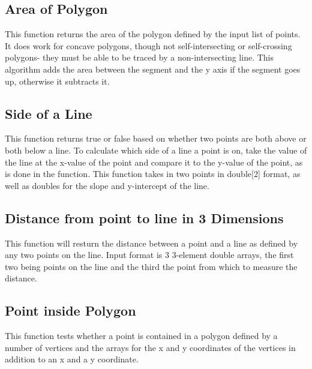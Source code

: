 \subsection{Area of Polygon}
This function returns the area of the polygon defined by the input list of points. It does work for concave polygons, though not self-intersecting or self-crossing polygons- they must be able to be traced by a non-intersecting line. This algorithm adds the area between the segment and the y axis if the segment goes up, otherwise it subtracts it.


\subsection{Side of a Line}
This function returns true or false based on whether two points are both above or both below a line. To calculate which side of a line a point is on, take the value of the line at the x-value of the point and compare it to the y-value of the point, as is done in the function. This function takes in two points in double[2] format, as well as doubles for the slope and y-intercept of the line.


\subsection{Distance from point to line in 3 Dimensions}
This function will resturn the distance between a point and a line as defined by any two points on the line. Input format is 3 3-element double arrays, the first two being points on the line and the third the point from which to measure the distance.


\subsection{Point inside Polygon}
This function tests whether a point is contained in a polygon defined by a number of vertices and the arrays for the x and y coordinates of the vertices in addition to an x and a y coordinate.

